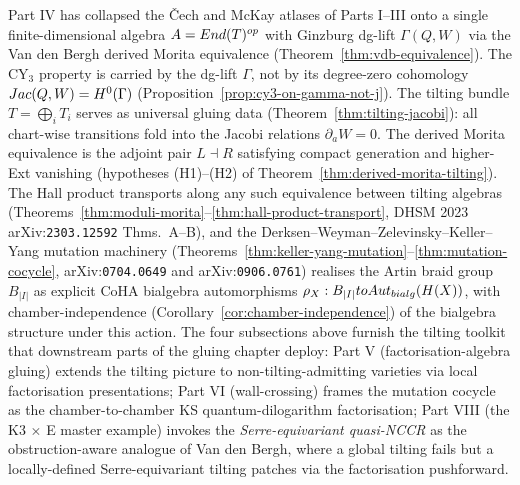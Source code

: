 Part IV has collapsed the \v{C}ech and McKay atlases of Parts I--III onto a
single finite-dimensional algebra $A = End(T)^{op}$ with Ginzburg
dg-lift $\Gamma(Q, W)$ via the Van den Bergh derived Morita equivalence
(Theorem~\ref{thm:vdb-equivalence}). The CY$_3$ property is carried by the
dg-lift $\Gamma$, not by its degree-zero cohomology $Jac(Q, W) = H^0(\Gamma)$
(Proposition~\ref{prop:cy3-on-gamma-not-j}). The tilting bundle
$T = \bigoplus_i T_i$ serves as universal gluing data
(Theorem~\ref{thm:tilting-jacobi}): all chart-wise transitions fold into the
Jacobi relations $\partial_a W = 0$. The derived Morita equivalence is the
adjoint pair $L \dashv R$ satisfying compact generation and higher-Ext
vanishing (hypotheses (H1)--(H2) of Theorem~\ref{thm:derived-morita-tilting}).
The Hall product transports along any such equivalence between tilting algebras
(Theorems~\ref{thm:moduli-morita}--\ref{thm:hall-product-transport}, DHSM 2023
arXiv:\texttt{2303.12592} Thms.~A--B), and the
Derksen--Weyman--Zelevinsky--Keller--Yang mutation machinery
(Theorems~\ref{thm:keller-yang-mutation}--\ref{thm:mutation-cocycle},
arXiv:\texttt{0704.0649} and arXiv:\texttt{0906.0761})
realises the Artin braid group $B_{|I|}$ as explicit CoHA bialgebra
automorphisms $\rho_X : B_{|I|} to Aut_{bialg}(H(X))$,
with chamber-independence
(Corollary~\ref{cor:chamber-independence}) of the bialgebra structure under
this action. The
four subsections above furnish the tilting toolkit that downstream parts of
the gluing chapter deploy: Part V (factorisation-algebra gluing) extends the
tilting picture to non-tilting-admitting varieties via local factorisation
presentations; Part VI (wall-crossing) frames the mutation cocycle as the
chamber-to-chamber KS quantum-dilogarithm factorisation; Part VIII (the
K3 $\times$ E master example) invokes the \emph{Serre-equivariant quasi-NCCR}
as the obstruction-aware analogue of Van den Bergh, where a global tilting
fails but a locally-defined Serre-equivariant tilting patches via the
factorisation pushforward.
